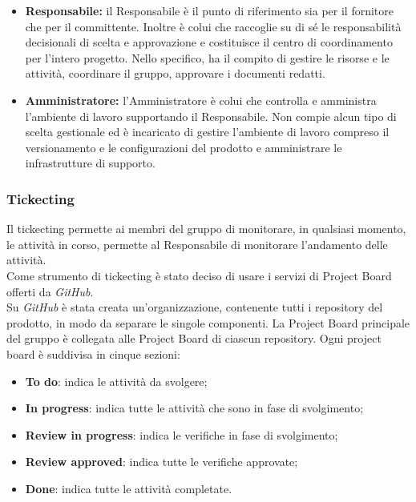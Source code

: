 \begin{itemize}
   				\item \textbf{Responsabile:} il Responsabile è il punto di riferimento sia per il fornitore che per il committente. Inoltre è colui che raccoglie su di sé le responsabilità decisionali di scelta e approvazione e costituisce il centro di coordinamento per l'intero progetto. Nello specifico, ha il compito di gestire le risorse e le attività, coordinare il gruppo, approvare i documenti redatti. 
   				\item \textbf{Amministratore:} l'Amministratore è colui che controlla e amministra l'ambiente di lavoro supportando il Responsabile. Non compie alcun tipo di scelta gestionale ed è incaricato di gestire  l'ambiente di lavoro compreso il versionamento e le configurazioni del prodotto e amministrare le infrastrutture di supporto.
   			\end{itemize}
   		
   		\subsubsection{Tickecting}
   		Il tickecting permette ai membri del gruppo di monitorare, in qualsiasi momento, le attività in corso, permette al Responsabile di monitorare l'andamento delle attività.\\   		
   		\noindent Come strumento di tickecting è stato deciso di usare i servizi di Project Board offerti da \textit{GitHub\glos}.\\   		
   		Su \textit{GitHub\glo} è stata creata un'organizzazione, contenente tutti i repository del prodotto, in modo da separare le singole componenti.
   		La Project Board principale del gruppo è collegata alle Project Board di ciascun repository.
   		Ogni project board è suddivisa in cinque sezioni:
   		\begin{itemize}
   			\item \textbf{To do}: indica le attività da svolgere;
   			\item \textbf{In progress}: indica tutte le attività che sono in fase di svolgimento;
   			\item \textbf{Review in progress}: indica le verifiche in fase di svolgimento;
   			\item \textbf{Review approved}: indica tutte le verifiche approvate;
   			\item \textbf{Done}: indica tutte le attività completate.
   		\end{itemize}
%   		
%   		
